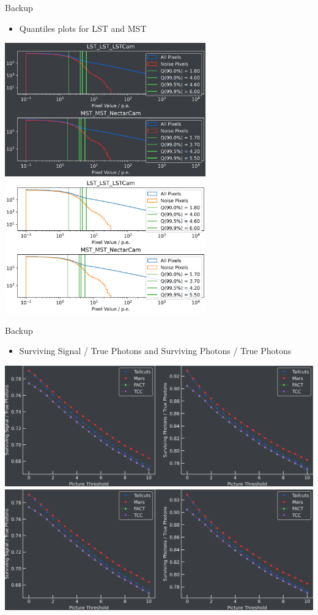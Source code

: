 \begin{frame}{Backup}
    \begin{itemize}
        \item Quantiles plots for LST and MST
    \end{itemize}
    \centering
    \ifdefined\darktheme
        \includegraphics[width=0.65\textwidth]{plots/noise_study/quantiles_dark.png}
    \else
        \includegraphics[width=0.65\textwidth]{plots/noise_study/quantiles_light.png}
    \fi
\end{frame}
\begin{frame}{Backup}
    \begin{itemize}
        \item Surviving Signal / True Photons and Surviving Photons / True Photons
    \end{itemize}
    \centering
    \ifdefined\darktheme
        \includegraphics[width=\textwidth]{plots/survsignal_dark.png}
    \else
        \includegraphics[width=\textwidth]{plots/survsignal_dark.png}
    \fi
\end{frame}
